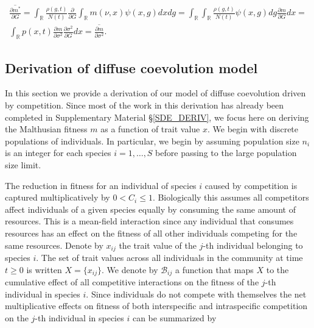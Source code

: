 \documentclass[]{article}
\begin{document}
\begin{multline}
\overline{\frac{\partial m^*}{\partial G}}=\int_{\mathbb{R}}\frac{\rho(g,t)}{N(t)}\frac{\partial}{\partial G}\int_\mathbb{R}m(\nu,x)\psi(x,g)dxdg=\int_{\mathbb{R}}\int_\mathbb{R}\frac{\rho(g,t)}{N(t)}\psi(x,g)dg\frac{\partial m}{\partial G}dx= \\
\int_\mathbb{R}p(x,t)\frac{\partial m}{\partial\sigma^2}\frac{\partial\sigma^2}{\partial G}dx=\overline{\frac{\partial m}{\partial\sigma^2}}.
\end{multline}

\hypertarget{derivation-of-diffuse-coevolution-model}{%
\subsection{\texorpdfstring{Derivation of diffuse coevolution model
\label{diffuse}}{Derivation of diffuse coevolution model }}\label{derivation-of-diffuse-coevolution-model}}

In this section we provide a derivation of our model of diffuse
coevolution driven by competition. Since most of the work in this
derivation has already been completed in Supplementary Material
\S\ref{SDE_DERIV}, we focus here on deriving the Malthusian fitness
\(m\) as a function of trait value \(x\). We begin with discrete
populations of individuals. In particular, we begin by assuming
population size \(n_i\) is an integer for each species \(i=1,\dots,S\)
before passing to the large population size limit.

The reduction in fitness for an individual of species \(i\) caused by
competition is captured multiplicatively by \(0<C_i\leq1\). Biologically
this assumes all competitors affect individuals of a given species
equally by consuming the same amount of resources. This is a mean-field
interaction since any individual that consumes resources has an effect
on the fitness of all other individuals competing for the same
resources. Denote by \(x_{ij}\) the trait value of the \(j\)-th
individual belonging to species \(i\). The set of trait values across
all individuals in the community at time \(t\geq0\) is written
\(X=\{x_{ij}\}\). We denote by \(\mathscr{B}_{ij}\) a function that maps
\(X\) to the cumulative effect of all competitive interactions on the
fitness of the \(j\)-th individual in species \(i\). Since individuals
do not compete with themselves the net multiplicative effects on fitness
of both interspecific and intraspecific competition on the \(j\)-th
individual in species \(i\) can be summarized by
\end{document}
